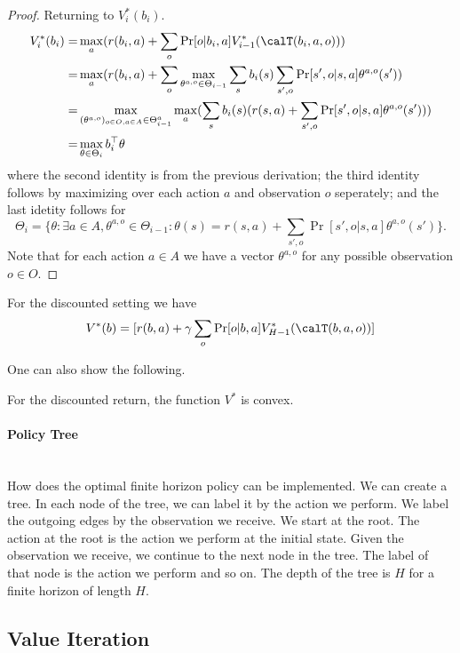 \begin{proof}
Returning to $V^*_i(b_i)$.
\begin{align*}
V^*_i(b_i)=&\max_a (r(b_i,a)+\sum_o \Pr[o|b_i,a]V^*_{i-1}(\calT(b_i,a,o)))\\
=&\max_a  (r(b_i,a)+\sum_o \max_{\theta^{a,o}\in\Theta_{i-1}}  \sum_s b_i(s)\sum_{s',o} \Pr[s',o|s,a]\theta^{a,o}(s'))\\
=&\max_{(\theta^{a,o})_{o\in O,a\in A}\in\Theta^a_{i-1}} \max_a (\sum_s b_i(s)(r(s,a)+\sum_{s',o} \Pr[s',o|s,a]\theta^{a,o}(s')))\\
=&\max_{\theta\in \Theta_i} b_i^\top \theta
\end{align*}
where the second identity is from the previous derivation;
the third identity follows by maximizing over each action $a$ and observation $o$ seperately;
and the last idetity follows for
\[
\Theta_i=\{\theta: \exists a\in A, \theta^{a,o}\in\Theta_{i-1} :\theta(s)=r(s,a)+\sum_{s',o}
\Pr[s',o|s,a]\theta^{a,o}(s') \}.
\]
Note that for each action $a\in A$ we have a vector $\theta^{a,o}$ for any possible observation $o\in O$.
\end{proof}


For the discounted setting we have
\[
V^*(b)=[r(b,a)+\gamma\sum_o \Pr[o|b,a]V^*_{H-1}(\calT(b,a,o))]
\]


One can also show the following.
\begin{theorem}
For the discounted return, the function $V^*$ is convex.
\end{theorem}

\paragraph{Policy Tree}\ \\
How does the optimal finite horizon policy can be implemented. We
can create a tree. In each node of the tree, we can label it by the
action we perform. We label the outgoing edges by the observation we
receive. We start at the root. The action at the root is the action
we perform at the initial state. Given the observation we receive,
we continue to the next node in the tree. The label of that node is
the action we perform and so on. The depth of the tree is $H$ for a
finite horizon of length $H$.

\subsection{Value Iteration}

